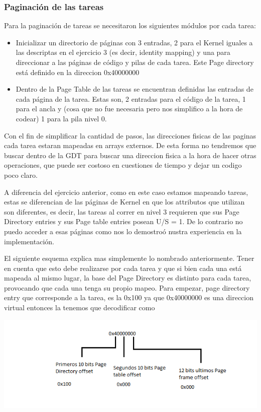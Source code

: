 \subsubsection{Paginaci\'on de las tareas}

Para la paginaci\'on de tareas se necesitaron los siguientes m\'odulos por cada tarea:
\begin{itemize}
 \item Inicializar un directorio de p\'aginas con 3 entradas, 2 para el Kernel iguales a las descriptas en el ejercicio 3 (es decir, identity mapping) 
 y una para direccionar a las p\'aginas de c\'odigo y pilas de cada tarea. Este Page directory est\'a definido en la direccion 0x40000000
 \item Dentro de la Page Table de las tareas se encuentran definidas las entradas de cada p\'agina de la tarea. Estas son, 2 entradas para
el c\'odigo de la tarea, 1 para el ancla y (cosa que no fue necesaria pero nos simplifico a la hora de codear) 1 para la pila nivel 0.
\end{itemize}

Con el fin de simplificar la cantidad de pasos, las direcciones fisicas de las paginas cada tarea estaran mapeadas en arrays externos. De esta forma no
tendremos que buscar dentro de la GDT para buscar una direccion fisica a la hora de hacer otras operaciones, que puede ser costoso en cuestiones de tiempo
y dejar un codigo poco claro.

A diferencia del ejercicio anterior, como en este caso estamos mapeando tareas, estas se diferencian de las p\'aginas de Kernel en que
los attributos que utilizan son diferentes, es decir, las tareas al correr en nivel 3 requieren que sus Page Directory entries y sus
Page table entries posean U/S = 1. De lo contrario no puedo acceder a esas p\'aginas como nos lo demostro\'o nustra experiencia en la
implementaci\'on.

El siguiente esquema explica mas simplemente lo nombrado anteriormente. Tener en cuenta que esto debe realizarse por cada tarea y que si
bien cada una est\'a mapeada al mismo lugar, la base del Page Directory es distinto para cada tarea, provocando que cada una tenga su
propio mapeo. Para empezar, page directory entry que corresponde a la tarea, es la 0x100 ya que 0x40000000 es una direccion virtual entonces
la tenemos que decodificar como 

\begin{center}
  \includegraphics[scale=0.6]{imagenes/ComoDividoVirtual.png} 
\end{center}


